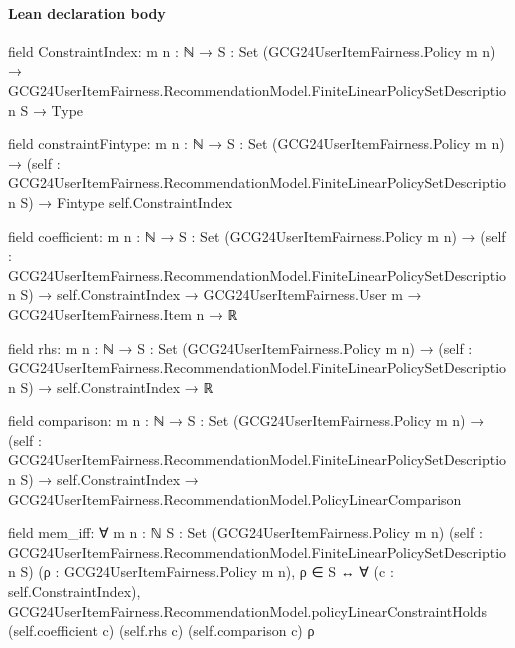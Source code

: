\documentclass[10pt]{article}
\begin{document}
\paragraph{Lean declaration body}
\begin{ReviewVerbatim}
field ConstraintIndex:
{m n : ℕ} →
  {S : Set (GCG24UserItemFairness.Policy m n)} →
    GCG24UserItemFairness.RecommendationModel.FiniteLinearPolicySetDescription S → Type

field constraintFintype:
{m n : ℕ} →
  {S : Set (GCG24UserItemFairness.Policy m n)} →
    (self : GCG24UserItemFairness.RecommendationModel.FiniteLinearPolicySetDescription S) → Fintype self.ConstraintIndex

field coefficient:
{m n : ℕ} →
  {S : Set (GCG24UserItemFairness.Policy m n)} →
    (self : GCG24UserItemFairness.RecommendationModel.FiniteLinearPolicySetDescription S) →
      self.ConstraintIndex → GCG24UserItemFairness.User m → GCG24UserItemFairness.Item n → ℝ

field rhs:
{m n : ℕ} →
  {S : Set (GCG24UserItemFairness.Policy m n)} →
    (self : GCG24UserItemFairness.RecommendationModel.FiniteLinearPolicySetDescription S) → self.ConstraintIndex → ℝ

field comparison:
{m n : ℕ} →
  {S : Set (GCG24UserItemFairness.Policy m n)} →
    (self : GCG24UserItemFairness.RecommendationModel.FiniteLinearPolicySetDescription S) →
      self.ConstraintIndex → GCG24UserItemFairness.RecommendationModel.PolicyLinearComparison

field mem_iff:
∀ {m n : ℕ} {S : Set (GCG24UserItemFairness.Policy m n)}
  (self : GCG24UserItemFairness.RecommendationModel.FiniteLinearPolicySetDescription S)
  (ρ : GCG24UserItemFairness.Policy m n),
  ρ ∈ S ↔
    ∀ (c : self.ConstraintIndex),
      GCG24UserItemFairness.RecommendationModel.policyLinearConstraintHolds (self.coefficient c) (self.rhs c)
        (self.comparison c) ρ
\end{ReviewVerbatim}
\end{document}
